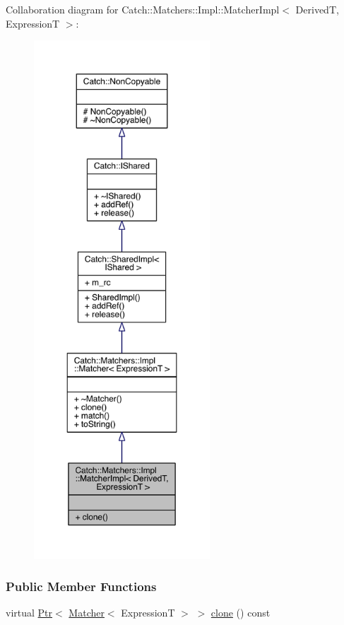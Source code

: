 Collaboration diagram for Catch\+:\+:Matchers\+:\+:Impl\+:\+:Matcher\+Impl$<$ Derived\+T, Expression\+T $>$\+:\nopagebreak
\begin{figure}[H]
\begin{center}
\leavevmode
\includegraphics[height=550pt]{a00340}
\end{center}
\end{figure}
\subsubsection*{Public Member Functions}
\begin{DoxyCompactItemize}
\item 
virtual \hyperlink{a00065}{Ptr}$<$ \hyperlink{a00047}{Matcher}$<$ Expression\+T $>$ $>$ \hyperlink{a00048_afe2e10779f91394f80ff5c894fb1bfab}{clone} () const 
\end{DoxyCompactItemize}
